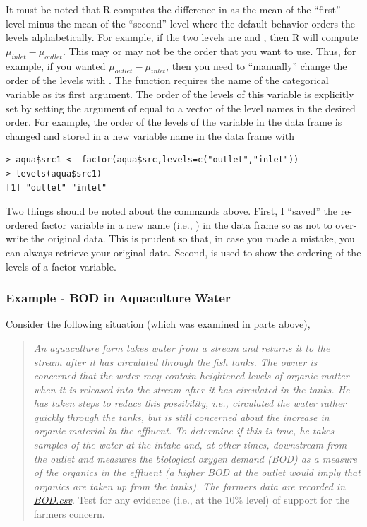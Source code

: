 \documentclass[10pt,openany]{book}\usepackage[]{graphicx}\usepackage[]{color}
\makeatletter
\newenvironment{kframe}{%
 \def\at@end@of@kframe{}%
 \ifinner\ifhmode%
  \def\at@end@of@kframe{\end{minipage}}%
  \begin{minipage}{\columnwidth}%
 \fi\fi%
 \def\FrameCommand##1{\hskip\@totalleftmargin \hskip-\fboxsep
 \colorbox{shadecolor}{##1}\hskip-\fboxsep
     \hskip-\linewidth \hskip-\@totalleftmargin \hskip\columnwidth}%
 \MakeFramed {\advance\hsize-\width
   \@totalleftmargin\z@ \linewidth\hsize
   \@setminipage}}%
 {\par\unskip\endMakeFramed%
 \at@end@of@kframe}
\newenvironment{knitrout}{}{} %
\makeatother
\begin{document}
It must be noted that R computes the difference in  as the mean of the ``first'' level minus the mean of the ``second'' level where the default behavior orders the levels alphabetically.  For example, if the two levels are  and , then R will compute $\mu_{inlet}-\mu_{outlet}$.  This may or may not be the order that you want to use.  Thus, for example, if you wanted $\mu_{outlet}-\mu_{inlet}$, then you need to ``manually'' change the order of the levels with .  The  function requires the name of the categorical variable as its first argument.  The order of the levels of this variable is explicitly set by setting the  argument of  equal to a vector of the level names in the desired order.  For example, the order of the levels of the  variable in the  data frame is changed and stored in a new variable name in the data frame with
\begin{knitrout}
\color{fgcolor}\begin{kframe}
\begin{verbatim}
> aqua$src1 <- factor(aqua$src,levels=c("outlet","inlet"))
> levels(aqua$src1)
[1] "outlet" "inlet" 
\end{verbatim}
\end{kframe}
\end{knitrout}
Two things should be noted about the commands above.  First, I ``saved'' the re-ordered factor variable in a new name (i.e., ) in the data frame so as not to over-write the original data.  This is prudent so that, in case you made a mistake, you can always retrieve your original data.  Second,  is used to show the ordering of the levels of a factor variable.

\subsubsection{Example - BOD in Aquaculture Water}
Consider the following situation (which was examined in parts above),
\begin{quote}
\textsl{An aquaculture farm takes water from a stream and returns it to the stream after it has circulated through the fish tanks.  The owner is concerned that the water may contain heightened levels of organic matter when it is released into the stream after it has circulated in the tanks.  He has taken steps to reduce this possibility, i.e., circulated the water rather quickly through the tanks, but is still concerned about the increase in organic material in the effluent.  To determine if this is true, he takes samples of the water at the intake and, at other times, downstream from the outlet and measures the biological oxygen demand (BOD) as a measure of the organics in the effluent (a higher BOD at the outlet would imply that organics are taken up from the tanks).  The farmers data are recorded in \href{https://raw.githubusercontent.com/droglenc/NCData/master/BOD.csv}{BOD.csv}}.  Test for any evidence (i.e., at the 10\% level) of support for the farmers concern.
\end{quote}
\end{document}
